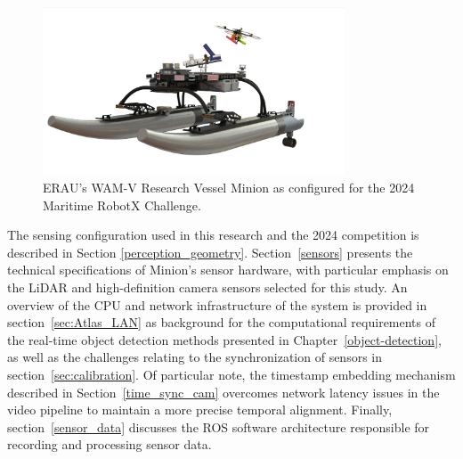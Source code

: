 \documentclass{erauthesis}
\begin{document}

\begin{figure}[t]
\centering
\includegraphics[width=0.8\textwidth]{Images/Minion.png}
\caption{ERAU's \ac{WAM-V} Research Vessel Minion as configured for the 2024 Maritime RobotX Challenge.}
\label{fig:minion}
\end{figure}

The sensing configuration used in this research and the 2024 competition is described in Section \ref{perception_geometry}.
Section~\ref{sensors} presents the technical specifications of Minion's sensor hardware, with particular emphasis on the \ac{LiDAR} and high-definition camera sensors selected for this study.
An overview of the CPU and network infrastructure of the system is provided in section~\ref{sec:Atlas_LAN} as background for the computational requirements of the real-time object detection methods presented in Chapter~\ref{object-detection}, as well as the challenges relating to the synchronization of sensors in section~\ref{sec:calibration}.
Of particular note, the timestamp embedding mechanism described in Section~\ref{time_sync_cam} overcomes network latency issues in the video pipeline to maintain a more precise temporal alignment.
Finally, section~\ref{sensor_data} discusses the \ac{ROS} software architecture responsible for recording and processing sensor data.
\end{document}
